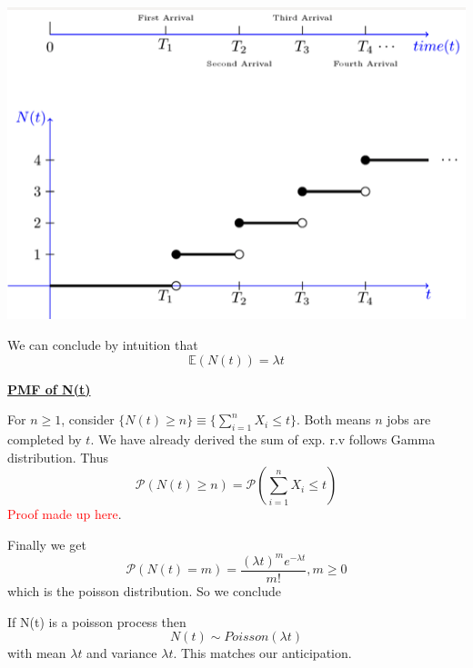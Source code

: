 \documentclass[10.5pt]{article}
\newcommand{\prob}[0]{\mathcal{P}}
\newenvironment{changemargin}[2]{%
  \begin{list}{}{%
    \setlength{\topsep}{0pt}%
    \setlength{\leftmargin}{#1}%
    \setlength{\rightmargin}{#2}%
    \setlength{\listparindent}{\parindent}%
    \setlength{\itemindent}{\parindent}%
    \setlength{\parsep}{\parskip}%
  }%
  \item[]}{\end{list}}
\begin{document}
\begin{changemargin}{-0.125in}{0in}
\begin{enumerate}
\begin{enumerate}
\begin{center}
                   \includegraphics[scale = 0.36]{count}
                   
                   \end{center}
                   
                   We can conclude by intuition that 
                   \[
                   \mathbb{E}(N(t)) = \lambda t
                   \]
                   
                   \smallskip
                   
                   \underline{\textbf{PMF of N(t)}}
                   
                   \smallskip
                   
                   For $n \geq 1$, consider $\{N(t) \geq n\} \equiv \{\sum_{i = 1}^{n} X_i \leq t\}$. Both means $n$ jobs are completed by $t$. We have already derived the sum of exp. r.v follows Gamma distribution. Thus 
                   \[
                   \prob(N(t) \geq n) = \prob(\sum_{i = 1}^{n} X_i \leq t)
                   \]
                   \textcolor{red}{Proof made up here}. 
                   
                   \smallskip
                   
                   Finally we get 
                   \[
                   \prob(N(t) = m) = \frac{(\lambda t)^m e^{-\lambda t}}{m!}, m \geq 0
                   \]
                   which is the poisson distribution. So we conclude 
                   
                   \begin{theorem}
                   	If N(t) is a poisson process then 
                   	\[
                   	N(t) \sim Poisson(\lambda t)
                   	\]
                   	with mean $\lambda t$ and variance $\lambda t$. This matches our anticipation. 
                   \end{theorem}
                   

\end{enumerate}
\end{enumerate}
\end{changemargin}
\end{document}
